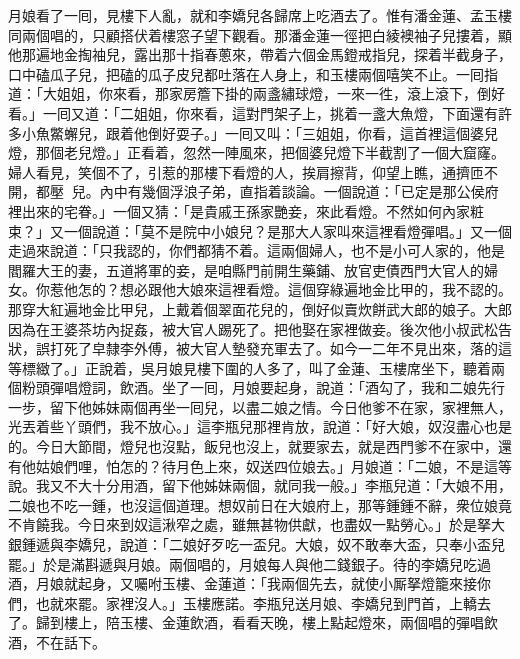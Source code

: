 月娘看了一囘，見樓下人亂，就和李嬌兒各歸席上吃酒去了。惟有潘金蓮、孟玉樓同兩個唱的，只顧搭伏着樓窓子望下觀看。那潘金蓮一徑把白綾襖袖子兒摟着，顯他那遍地金掏袖兒，露出那十指春蔥來，帶着六個金馬鐙戒指兒，探着半截身子，口中磕瓜子兒，把磕的瓜子皮兒都吐落在人身上，{}和玉樓兩個嘻笑不止。{}一囘指道：「大姐姐，你來看，那家房簷下掛的兩盞繡球燈，一來一徃，滾上滾下，倒好看。」一囘又道：「二姐姐，你來看，這對門架子上，挑着一盞大魚燈，下面還有許多小魚鱉蠏兒，跟着他倒好耍子。」一囘又叫：「三姐姐，你看，這首裡這個婆兒燈，那個老兒燈。」正看着，忽然一陣風來，把個婆兒燈下半截割了一個大窟窿。{}婦人看見，笑個不了，引惹的那樓下看燈的人，挨肩擦背，仰望上瞧，通擠匝不開，都壓𨇽𨇽兒。內中有幾個浮浪子弟，直指着談論。一個說道：「已定是那公侯府裡出來的宅眷。」一個又猜：「是貴戚王孫家艷妾，來此看燈。不然如何內家粧束？」又一個說道：「莫不是院中小娘兒？是那大人家叫來這裡看燈彈唱。」又一個走過來說道：「只我認的，你們都猜不着。這兩個婦人，也不是小可人家的，他是閻羅大王的妻，五道將軍的妾，是咱縣門前開生藥鋪、放官吏債西門大官人的婦女。你惹他怎的？想必跟他大娘來這裡看燈。這個穿綠遍地金比甲的，我不認的。{}那穿大紅遍地金比甲兒，上戴着個翠面花兒的，倒好似賣炊餅武大郎的娘子。大郎因為在王婆茶坊內捉姦，被大官人踢死了。把他娶在家裡做妾。後次他小叔武松告狀，誤打死了皁隸李外傅，被大官人墊發充軍去了。{}如今一二年不見出來，落的這等標緻了。」正說着，吳月娘見樓下圍的人多了，叫了金蓮、玉樓席坐下，聽着兩個粉頭彈唱燈詞，飲酒。坐了一囘，月娘要起身，說道：「酒勾了，我和二娘先行一步，留下他姊妹兩個再坐一囘兒，以盡二娘之情。今日他爹不在家，家裡無人，光丟着些丫頭們，{}我不放心。」這李瓶兒那裡肯放，說道：「好大娘，奴沒盡心也是的。今日大節間，燈兒也沒點，飯兒也沒上，就要家去，就是西門爹不在家中，還有他姑娘們哩，怕怎的？待月色上來，奴送四位娘去。」月娘道：「二娘，不是這等說。我又不大十分用酒，留下他姊妹兩個，就同我一般。」李瓶兒道：「大娘不用，二娘也不吃一鍾，也沒這個道理。想奴前日在大娘府上，那等鍾鍾不辭，衆位娘竟不肯饒我。今日來到奴這湫窄之處，雖無甚物供獻，也盡奴一點勞心。」於是拏大銀鍾遞與李嬌兒，說道：「二娘好歹吃一盃兒。大娘，奴不敢奉大盃，只奉小盃兒罷。」於是滿斟遞與月娘。兩個唱的，月娘每人與他二錢銀子。待的李嬌兒吃過酒，月娘就起身，又囑咐玉樓、金蓮道：「我兩個先去，就使小厮拏燈籠來接你們，也就來罷。家裡沒人。」玉樓應諾。李瓶兒送月娘、李嬌兒到門首，上轎去了。歸到樓上，陪玉樓、金蓮飲酒，看看天晚，樓上點起燈來，兩個唱的彈唱飲酒，不在話下。


